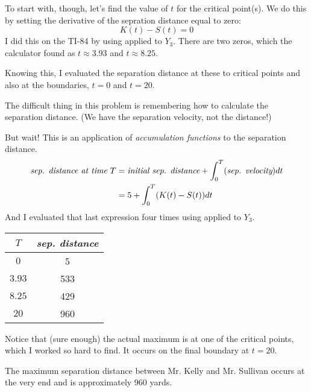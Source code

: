 \documentclass[12pt,letterpaper]{memoir}
\begin{document}
To start with, though, let's find the value of $t$ for the critical point(s).
We do this by setting the derivative of the sepration distance equal to zero:
\begin{equation*}
    K(t) - S(t) = 0
\end{equation*}
I did this on the TI-84 by using 
{\ttfamily [2ND] [CALC] [zero]} applied to $Y_3$. 
There are two zeros, which the calculator found as $t\approx 3.93$ and $t\approx 8.25$.

Knowing this, I evaluated the separation distance at these to critical points and also 
at the boundaries, $t=0$ and $t=20$.

The difficult thing in this problem 
is remembering how to calculate the separation distance.
(We have the separation velocity, not the distance!)

But wait! This is an application of {\itshape accumulation functions} 
to the separation distance.
\begin{align*}
    \text{\itshape sep. distance at time}\,\, T 
        &= \text{\itshape initial sep. distance} 
        + 
        \int_0^T (\text{\itshape sep. velocity}) dt \\ 
        &= 5 
        + \int_0^T (K(t) - S(t)) dt 
\end{align*}
And I evaluated that last expression four times using {\ttfamily [MATH] [9]} 
applied to $Y_3$.

\begin{center}
\begin{tabular}{c|c}
    \toprule
    $T$ & {\itshape sep. distance} \\ 
    \midrule
    $0$ & 5\\
    $3.93$ & 533\\ 
    $8.25$ & 429 \\ 
    $20$ & 960\\
    \bottomrule
\end{tabular}
\end{center}

Notice that (sure enough) the actual maximum is  at one of the critical points,
which I worked so hard to find. 
It occurs on the final boundary at $t=20$. 
\begin{tcolorbox}[colback=white]
    The maximum separation distance between Mr. Kelly and Mr. Sullivan 
    occurs at the very end and is approximately 960 yards.
\end{tcolorbox}
\end{document}
